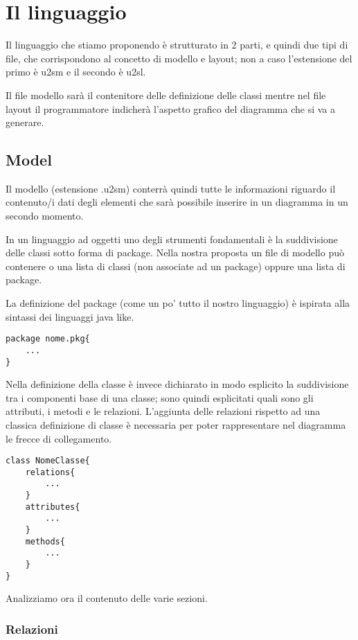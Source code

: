 \chapter{Il linguaggio}

Il linguaggio che stiamo proponendo è strutturato in 2 parti, e quindi due tipi di
file, che corrispondono al concetto di modello e layout; non a caso l'estensione
del primo è u2sm e il secondo è u2sl.

Il file modello sarà il contenitore delle definizione delle classi mentre nel
file layout il programmatore indicherà l'aspetto grafico del diagramma che si va
a generare.

\section{Model}

Il modello (estensione .u2sm) conterrà quindi tutte le informazioni riguardo il
contenuto/i dati
degli elementi che sarà possibile inserire in un diagramma in un secondo
momento. 

In un linguaggio ad oggetti uno degli strumenti fondamentali è la suddivisione 
delle classi sotto forma di package. Nella nostra proposta un file di modello
può contenere o una lista di classi (non associate ad un package) oppure una
lista di package.

La definizione del package (come un po' tutto il nostro linguaggio) è 
ispirata alla sintassi dei linguaggi java like.

\begin{lstlisting}[caption={Dichiarazione di package}, style={model}]
package nome.pkg{
	...  	
}
\end{lstlisting}

Nella definizione della classe è invece dichiarato in modo esplicito la
suddivisione tra i componenti base di una classe; sono quindi esplicitati quali
sono gli attributi, i metodi e le relazioni. L'aggiunta delle relazioni rispetto
ad una classica definizione di classe è necessaria per poter rappresentare nel
diagramma le frecce di collegamento.


\begin{lstlisting}[caption={Dichiarazione di classe}, style={model}]
class NomeClasse{
	relations{
		...
	}
	attributes{
		...
	}
	methods{
		...
	}
}
\end{lstlisting}

Analizziamo ora il contenuto delle varie sezioni.

\subsection{Relazioni}

